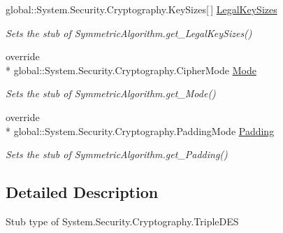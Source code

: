\begin{DoxyCompactItemize}
global\-::\-System.\-Security.\-Cryptography.\-Key\-Sizes\mbox{[}$\,$\mbox{]} \hyperlink{class_system_1_1_security_1_1_cryptography_1_1_fakes_1_1_stub_triple_d_e_s_a494fd6da84163f2993dd494c2fa56af8}{Legal\-Key\-Sizes}
\begin{DoxyCompactList}\small\item\em Sets the stub of Symmetric\-Algorithm.\-get\-\_\-\-Legal\-Key\-Sizes()\end{DoxyCompactList}\item 
override \\*
global\-::\-System.\-Security.\-Cryptography.\-Cipher\-Mode \hyperlink{class_system_1_1_security_1_1_cryptography_1_1_fakes_1_1_stub_triple_d_e_s_ae0fffd2b130fae75b40c0e72524c13c3}{Mode}
\begin{DoxyCompactList}\small\item\em Sets the stub of Symmetric\-Algorithm.\-get\-\_\-\-Mode()\end{DoxyCompactList}\item 
override \\*
global\-::\-System.\-Security.\-Cryptography.\-Padding\-Mode \hyperlink{class_system_1_1_security_1_1_cryptography_1_1_fakes_1_1_stub_triple_d_e_s_adee45d60407a85282f75d8164da1d5d6}{Padding}
\begin{DoxyCompactList}\small\item\em Sets the stub of Symmetric\-Algorithm.\-get\-\_\-\-Padding()\end{DoxyCompactList}\end{DoxyCompactItemize}


\subsection{Detailed Description}
Stub type of System.\-Security.\-Cryptography.\-Triple\-D\-E\-S



